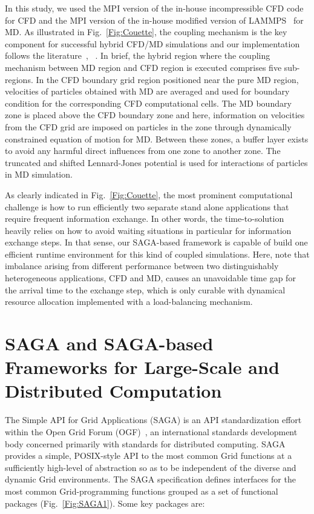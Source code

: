 \documentclass[conference,final]{IEEEtran}
\newcommand{\Nkimnote}[1]{ {\textcolor{green} { ***Nkim: #1 }}}
\newcommand{\Nkimnote}[1]{}
\begin{document}
In this study, we used the MPI version of the in-house incompressible CFD code~\cite{Lee} for CFD and the MPI version of the in-house modified version of LAMMPS~\cite{LAMMPS} for MD.  As illustrated in Fig.~\ref{Fig:Couette}, the coupling mechanism is the key component for successful hybrid CFD/MD simulations and our implementation follows the literature~\cite{Nie},~\cite{Yen} . In brief, the hybrid region where the coupling mechanism between MD region and CFD region is executed comprises five sub-regions.  In the CFD boundary grid region positioned near the pure MD region, velocities of particles obtained with MD are averaged and used for boundary condition for the corresponding CFD computational cells.  The MD boundary zone is placed above the CFD boundary zone and here, information on velocities from the CFD grid are imposed on particles in the zone through dynamically constrained equation of motion for MD.  Between these zones, a buffer layer exists to avoid any harmful direct influences from one zone to another zone.  The truncated and shifted Lennard-Jones potential is used for interactions of particles in MD simulation.

As clearly indicated in Fig.~\ref{Fig:Couette}, the most prominent computational challenge is how to run efficiently two separate stand alone applications that require frequent information exchange.  In other words, the time-to-solution heavily relies on how to avoid waiting situations in particular for information exchange steps.  In that sense, our SAGA-based framework is capable of build one efficient runtime environment for this kind of coupled simulations.  Here, note that imbalance arising from different performance between two distinguishably heterogeneous applications, CFD and MD, causes an unavoidable time gap for the arrival time to the exchange step, which is only curable with dynamical resource allocation implemented with a load-balancing mechanism.   



\section{SAGA and SAGA-based Frameworks for Large-Scale and Distributed Computation}

The Simple API for Grid Applications (SAGA) is an API standardization effort within the Open Grid Forum (OGF)~\cite{ogf_web}, an international standards development body concerned primarily with standards for distributed computing.  SAGA provides a simple, POSIX-style API to the most common Grid functions at a sufficiently high-level of abstraction so as to be %
independent of the diverse and dynamic Grid environments. The SAGA specification defines interfaces for the most common Grid-programming functions grouped as a set of functional packages (Fig.~\ref{Fig:SAGA1}). Some key packages are:
\end{document}
